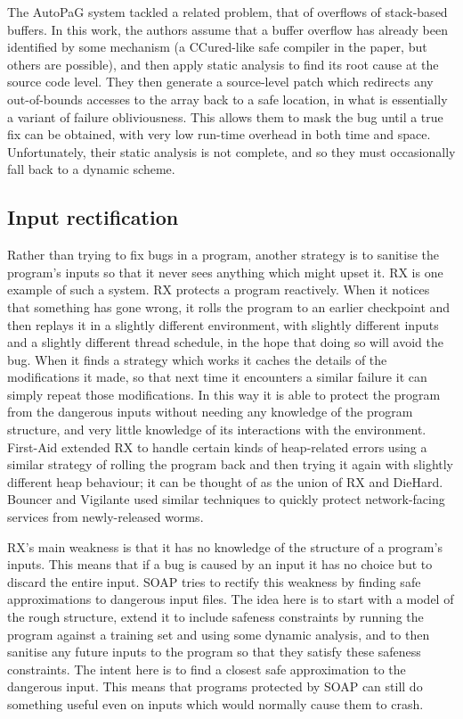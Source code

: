 The AutoPaG system\cite{Lin2007} tackled a related problem, that of
overflows of stack-based buffers.  In this work, the authors assume
that a buffer overflow has already been identified by some mechanism
(a CCured\cite{Necula2005}-like safe compiler in the paper, but others
are possible), and then apply static analysis to find its root cause
at the source code level.  They then generate a source-level patch
which redirects any out-of-bounds accesses to the array back to a safe
location, in what is essentially a variant of failure obliviousness.
This allows them to mask the bug until a true fix can be obtained,
with very low run-time overhead in both time and space.
Unfortunately, their static analysis is not complete, and so they
must occasionally fall back to a dynamic scheme.

\subsection{Input rectification}

Rather than trying to fix bugs in a program, another strategy is to
sanitise the program's inputs so that it never sees anything which
might upset it.  RX\cite{Qin2007} is one example of such a system.  RX
protects a program reactively.  When it notices that something has
gone wrong, it rolls the program to an earlier checkpoint and then
replays it in a slightly different environment, with slightly
different inputs and a slightly different thread schedule, in the hope
that doing so will avoid the bug.  When it finds a strategy which
works it caches the details of the modifications it made, so that next
time it encounters a similar failure it can simply repeat those
modifications.  In this way it is able to protect the program from the
dangerous inputs without needing any knowledge of the program
structure, and very little knowledge of its interactions with the
environment.  First-Aid\cite{Gao2009} extended RX to handle certain
kinds of heap-related errors using a similar strategy of rolling the
program back and then trying it again with slightly different heap
behaviour; it can be thought of as the union of RX and DieHard.
Bouncer\cite{Costa2007} and Vigilante\cite{Costa2008} used similar
techniques to quickly protect network-facing services from
newly-released worms.

RX's main weakness is that it has no knowledge of the structure of a
program's inputs.  This means that if a bug is caused by an input it
has no choice but to discard the entire input.  SOAP\cite{Long2012}
tries to rectify this weakness by finding safe approximations to
dangerous input files.  The idea here is to start with a model of the
rough structure, extend it to include safeness constraints by running
the program against a training set and using some dynamic analysis,
and to then sanitise any future inputs to the program so that they
satisfy these safeness constraints.  The intent here is to find a
closest safe approximation to the dangerous input.  This means that
programs protected by SOAP can still do something useful even on
inputs which would normally cause them to crash.

